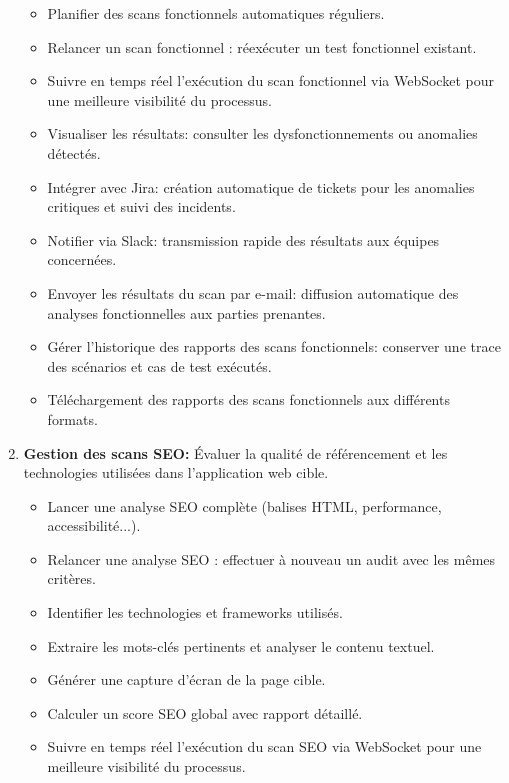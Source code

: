 \begin{justify}
\begin{enumerate}[left=-0.01cm]
\begin{itemize}[label=$\bullet$, left=-0.05cm]
                \item Planifier des scans fonctionnels automatiques réguliers.              
                \item Relancer un scan fonctionnel : réexécuter un test fonctionnel existant.
                \item Suivre en temps réel l’exécution du scan fonctionnel via WebSocket pour une meilleure visibilité du processus.
                \item Visualiser les résultats: consulter les dysfonctionnements ou anomalies détectés.
                \item Intégrer avec Jira: création automatique de tickets pour les anomalies critiques et suivi des incidents.
                \item Notifier via Slack: transmission rapide des résultats aux équipes concernées.
                \item Envoyer les résultats du scan par e-mail: diffusion automatique des analyses fonctionnelles aux parties prenantes.
                \item Gérer l’historique des rapports des scans fonctionnels: conserver une trace des scénarios et cas de test exécutés.
                \item Téléchargement des rapports des scans fonctionnels aux différents formats.
            \end{itemize}
        \item \textbf{Gestion des scans SEO:} Évaluer la qualité de référencement et les technologies utilisées dans l’application web cible.
            \begin{itemize}[label=$\bullet$, left=-0.05cm]
                \item Lancer une analyse SEO complète (balises HTML, performance, accessibilité...).
                \item Relancer une analyse SEO : effectuer à nouveau un audit avec les mêmes critères.
                \item Identifier les technologies et frameworks utilisés.
                \item Extraire les mots-clés pertinents et analyser le contenu textuel.
                \item Générer une capture d’écran de la page cible.
                \item Calculer un score SEO global avec rapport détaillé.
                \item Suivre en temps réel l’exécution du scan SEO via WebSocket pour une meilleure visibilité du processus.

\end{itemize}
\end{enumerate}
\end{justify}
